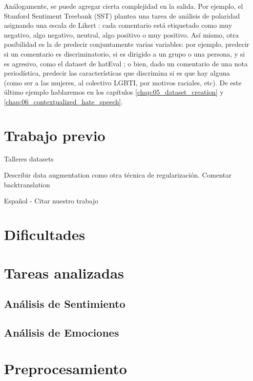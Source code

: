 Análogamente, se puede agregar cierta complejidad en la salida. Por ejemplo, el Stanford Sentiment Treebank (SST) \cite{socher-etal-2013-recursive} plantea una tarea de análisis de polaridad asignando una escala de Likert \cite{likert1932technique}: cada comentario está etiquetado como muy negativo, algo negativo, neutral, algo positivo o muy positivo. Así mismo, otra posibilidad es la de predecir conjuntamente varias variables: por ejemplo, predecir si un comentario es discriminatorio, si es dirigido a un grupo o una persona, y si es agresivo, como el dataset de hatEval \cite{hateval2019semeval}; o bien, dado un comentario de una nota periodística, predecir las características que discrimina si es que hay alguna (como ser a las mujeres, al colectivo LGBTI, por motivos raciales, etc). De este último ejemplo hablaremos en los capítulos \ref{chap:05_dataset_creation} y \ref{chap:06_contextualized_hate_speech}.




\section{Trabajo previo}

Talleres
datasets


Describir data augmentation como otra técnica de regularización. Comentar backtranslation

Español
- Citar nuestro trabajo

\section{Dificultades}

\section{Tareas analizadas}
\subsection{Análisis de Sentimiento}

\subsection{Análisis de Emociones}


\section{Preprocesamiento}

